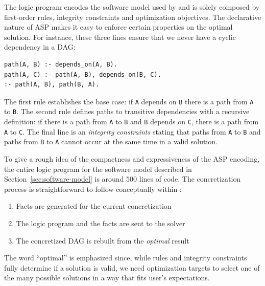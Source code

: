The logic program encodes the software model used by \spack{}
and is solely composed by first-order rules, integrity 
constraints and optimization objectives. 
The declarative nature of ASP makes it easy to enforce 
certain properties on the optimal solution. For instance, 
these three lines ensure that we never have a cyclic dependency
in a DAG:
\begin{verbatim}
path(A, B) :- depends_on(A, B).
path(A, C) :- path(A, B), depends_on(B, C).
:- path(A, B), path(B, A).
\end{verbatim}
The first rule establishes the base case: if \texttt{A} depends
on \texttt{B} there is a path from \texttt{A} to \texttt{B}.
The second rule defines paths to transitive dependencies 
with a recursive definition: if there is a path from \texttt{A} 
to \texttt{B} and \texttt{B} depends on \texttt{C}, there is
a path from \texttt{A} to \texttt{C}. The final line is an 
\emph{integrity constraints} stating that paths from \texttt{A} 
to \texttt{B} and paths from \texttt{B} to \texttt{A} cannot 
occur at the same time in a valid solution.

To give a rough idea of the compactness and expressiveness of 
the ASP encoding, the entire logic program for the software 
model described in Section~\ref{sec:software-model} is around 
$500$ lines of code. The concretization process is straightforward
to follow conceptually within \spack:
\begin{enumerate}
\item Facts are generated for the current concretization \footnotemark
\item The logic program and the facts are sent to the solver
\item The concretized DAG is rebuilt from the \emph{optimal} result
\end{enumerate}
The word ``optimal'' is emphasized since, while rules and integrity 
constraints fully determine if a solution is valid, we need 
optimization targets to select one of the many possible solutions
in a way that fits user's expectations.

